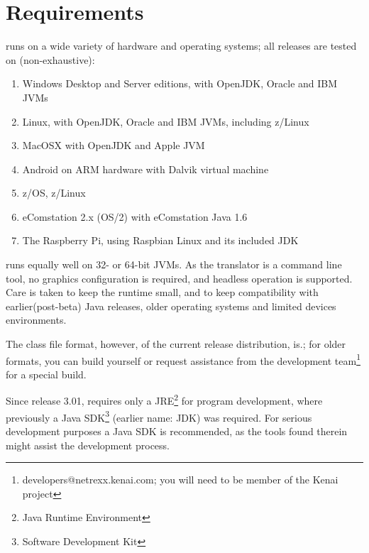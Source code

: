 \chapter{Requirements}
\nr{}  runs on a wide variety of
hardware and operating systems; all releases are tested on (non-exhaustive):
\begin{enumerate}
\item Windows Desktop and Server editions, with OpenJDK, Oracle and IBM JVMs
\item Linux, with OpenJDK, Oracle and IBM JVMs, including z/Linux
\item MacOSX with OpenJDK and Apple JVM
\item Android on ARM hardware with Dalvik virtual machine
\item z/OS, z/Linux
\item eComstation 2.x (OS/2) with eComstation Java 1.6
\item The Raspberry Pi, using Raspbian Linux and its included JDK
\end{enumerate}
\nr{} runs equally well on 32- or 64-bit JVMs. As the translator is
a command line tool, no graphics configuration is required, and
headless operation is supported. Care is taken to keep the \nr{} runtime small, and to keep
compatibility with earlier(post-beta) Java releases, older operating systems and
limited devices environments. 

The class file format, however, of the current release distribution, is.; for older formats, you
can build \nr{} yourself or request assistance from the development
team\footnote{developers@netrexx.kenai.com; you will
  need to be member of the Kenai \nr{} project} for a special build.
\begin{shaded}\noindent
Since release 3.01, \nr{} requires only a
JRE\footnote{Java Runtime Environment} for program development, where previously a
Java SDK\footnote{Software Development Kit} (earlier name: JDK) was required. For serious development
purposes a Java SDK is recommended, as the tools found therein might
assist the development process.
\end{shaded}\indent